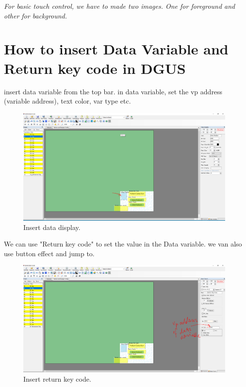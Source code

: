 \documentclass[12pt, A4]{article} %
\begin{document}
\emph{For basic touch control, we have to made two images. One for foreground and other for background. }

\newpage

\section{How to insert Data Variable and Return key code in DGUS}
insert data variable from the top bar. in data variable, set the vp address (variable address), text color, var type etc. 

\begin{figure}[!htb] %
	\centering
	\includegraphics[width=11cm]{dataDisplay} 
	\caption{Insert data display.\\}
\end{figure}
We can use "Return key code" to set the value in the Data variable. we van also use button effect and jump to.\\
\begin{figure}[!htb] %
	\centering
	\includegraphics[width=11cm]{returnKeyCode} 
	\caption{Insert return key code.\\}
\end{figure}

\newpage
\end{document}
